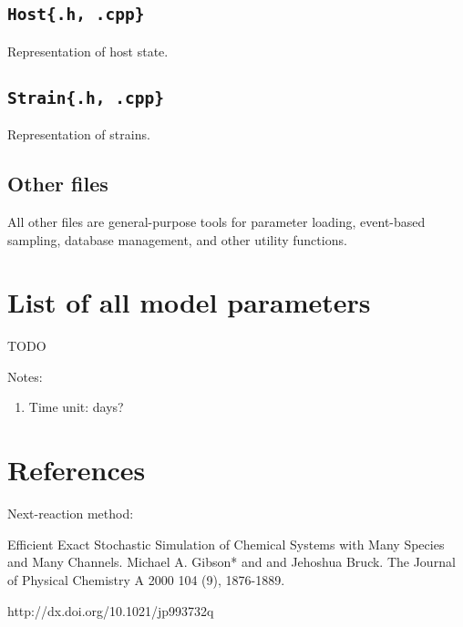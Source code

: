 \documentclass[11pt]{article}
\begin{document}
\subsection{\texttt{Host\{.h, .cpp\}}}

Representation of host state.

\subsection{\texttt{Strain\{.h, .cpp\}}}

Representation of strains.

\subsection{Other files}

All other files are general-purpose tools for parameter loading, event-based sampling, database management, and other utility functions.

\section{List of all model parameters}

TODO

Notes:
\begin{enumerate}
	\item Time unit: days?
\end{enumerate}

\section{References}

Next-reaction method:

Efficient Exact Stochastic Simulation of Chemical Systems with Many Species and Many Channels. Michael A. Gibson* and and Jehoshua Bruck. The Journal of Physical Chemistry A 2000 104 (9), 1876-1889.

http://dx.doi.org/10.1021/jp993732q
\end{document}
